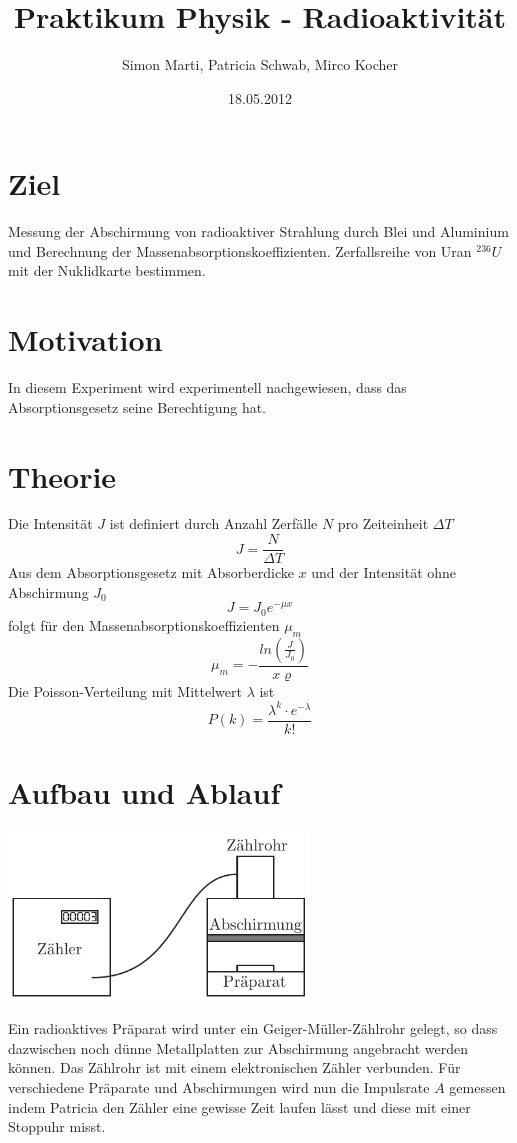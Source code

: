 \documentclass[12pt,a4paper]{article}
\title{Praktikum Physik - Radioaktivität}
\author{Simon Marti, Patricia Schwab, Mirco Kocher}
\date{18.05.2012}
\begin{document}
\maketitle

\section*{Ziel}
Messung der Abschirmung von radioaktiver Strahlung durch Blei und Aluminium und Berechnung der Massenabsorptionskoeffizienten. Zerfallsreihe von Uran $^{236}U$ mit der Nuklidkarte bestimmen.

\section*{Motivation}
In diesem Experiment wird experimentell nachgewiesen, dass das Absorptionsgesetz seine Berechtigung hat.

\section*{Theorie}
Die Intensit\"at $J$ ist definiert durch Anzahl Zerf\"alle $N$ pro Zeiteinheit $\Delta T$
\begin{equation}
J =\frac{N}{\Delta T}
\end{equation}
Aus dem Absorptionsgesetz mit Absorberdicke $x$ und der Intensit\"at ohne Abschirmung $J_0$
\begin{equation}
J = J_0 e^{-\mu x}
\end{equation}
folgt f\"ur den Massenabsorptionskoeffizienten $\mu_m$
\begin{equation}
\mu_m = - \frac{ln(\frac{J}{J_0})}{x \varrho}
\end{equation}
Die Poisson-Verteilung mit Mittelwert $\lambda$ ist
\begin{equation}
P(k) = \frac{\lambda^k \cdot e^{-\lambda}}{k!}
\end{equation}


\section*{Aufbau und Ablauf}
\begin{center}
\includegraphics[width=8cm]{illustration.pdf}
\end{center}
Ein radioaktives Präparat wird unter ein Geiger-Müller-Zählrohr gelegt, so dass dazwischen noch dünne Metallplatten zur Abschirmung angebracht werden können. Das Zählrohr ist mit einem elektronischen Zähler verbunden. Für verschiedene Präparate und Abschirmungen wird nun die Impulsrate $A$ gemessen indem Patricia den Zähler eine gewisse Zeit laufen lässt und diese mit einer Stoppuhr misst.
\end{document}
